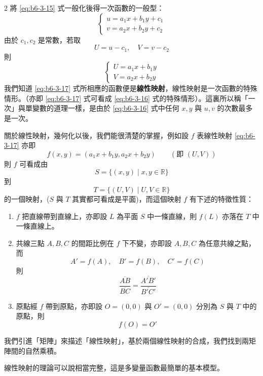 \begin{paracol}{2}
將 \eqref{eq:b6-3-15} 式一般化後得一次函數的一般型：
\begin{equation}
\begin{cases} u = a_1 x + b_1 y + c_1 \\ v = a_2 x + b_2 y + c_2 \end{cases} \label{eq:b6-3-16}
\end{equation}
由於 $c_1, c_2$ 是常數，若取
\[ U = u - c_1, \quad V = v - c_2 \]
則
\begin{equation}
\begin{cases} U = a_1 x + b_1 y \\ V = a_2 x + b_2 y \end{cases} \label{eq:b6-3-17}
\end{equation}
我們知道 \eqref{eq:b6-3-17} 式所相應的函數便是\textbf{線性映射}，線性映射是一次函數的特殊情形。（亦即 \eqref{eq:b6-3-17} 式可看成 \eqref{eq:b6-3-16} 式的特殊情形）。這裏所以稱「一次」與單變數的道理一樣，是由於 \eqref{eq:b6-3-16} 式中任何 $x, y$ 與 $u, v$ 的次數最多是一次。

關於線性映射，幾何化以後，我們能很清楚的掌握，例如設 $f$ 表線性映射 \eqref{eq:b6-3-17} 亦即
\[ f(x, y) = (a_1 x + b_1 y, a_2 x + b_2 y) \qquad (\text{即 } (U, V)) \]
則 $f$ 可看成由
\[ S = \{ (x,y) \mid x, y \in \mathbb{R} \} \]
到
\[ T = \{ (U,V) \mid U, V \in \mathbb{R} \} \]
的一個映射，($S$ 與 $T$ 其實都可看成是平面)，而這個映射 $f$ 有下述的特徵性質：
\begin{enumerate}[label=(\roman*), leftmargin=2em]
  \item $f$ 把直線帶到直線上，亦即設 $L$ 為平面 $S$ 中一條直線，則 $f(L)$ 亦落在 $T$ 中一條直線上。
  \item 共線三點 $A, B, C$ 的間距比例在 $f$ 下不變，亦即設 $A, B, C$ 為任意共線之點，而
  \[ A' = f(A), \quad B' = f(B), \quad C' = f(C) \]
  則
  \[ \dfrac{\overline{AB}}{\overline{BC}} = \dfrac{\overline{A'B'}}{\overline{B'C'}} \]
  \item 原點經 $f$ 帶到原點，亦即設 $O=(0,0)$ 與 $O'=(0,0)$ 分別為 $S$ 與 $T$ 中的原點，則
  \[ f(O) = O' \]
\end{enumerate}

我們引進「矩陣」來描述「線性映射」，基於兩個線性映射的合成，我們找到兩矩陣間的自然乘積。

線性映射的理論可以說相當完整，這是多變量函數最簡單的基本模型。

\switchcolumn


\end{paracol}
